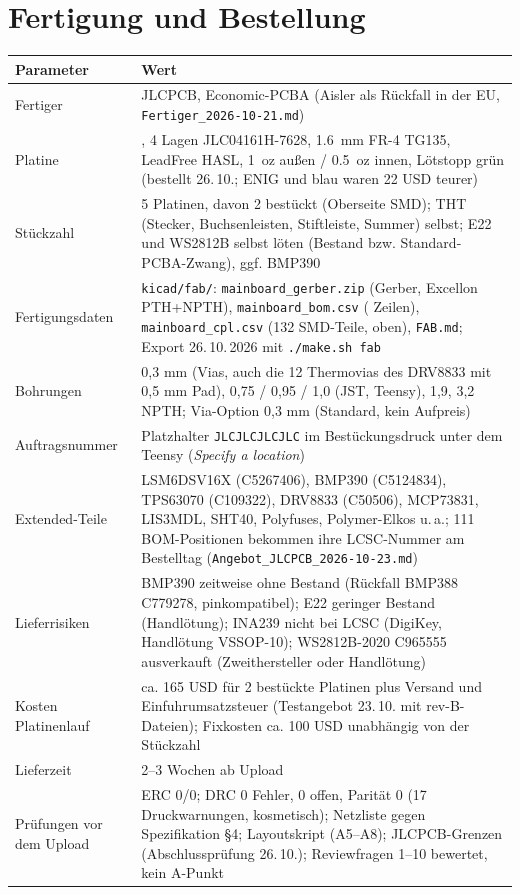 \documentclass[10pt,a4paper,twoside]{article}
\begin{document}
\section{Fertigung und Bestellung}
\begin{tabularx}{\textwidth}{L{40mm} X}
\toprule
\textbf{Parameter} & \textbf{Wert}\\
\midrule
Fertiger & JLCPCB, Economic-PCBA (Aisler als Rückfall in der EU, \texttt{Fertiger\_2026-10-21.md})\\
Platine & , 4 Lagen JLC04161H-7628, \SI{1.6}{mm} FR-4 TG135, LeadFree HASL, \SI{1}{oz} außen / \SI{0.5}{oz} innen, Lötstopp grün (bestellt 26.\,10.; ENIG und blau waren 22 USD teurer)\\
Stückzahl & 5 Platinen, davon 2 bestückt (Oberseite SMD); THT (Stecker, Buchsenleisten, Stiftleiste, Summer) selbst; E22 und WS2812B selbst löten (Bestand bzw. Standard-PCBA-Zwang), ggf. BMP390\\
Fertigungsdaten & \texttt{kicad/fab/}: \texttt{mainboard\_gerber.zip} (Gerber, Excellon PTH+NPTH), \texttt{mainboard\_bom.csv} (\bomLines{} Zeilen), \texttt{mainboard\_cpl.csv} (132 SMD-Teile, oben), \texttt{FAB.md}; Export 26.\,10.\,2026 mit \texttt{./make.sh fab}\\
Bohrungen & 0,3 mm (Vias, auch die 12 Thermovias des DRV8833 mit 0,5 mm Pad), 0,75 / 0,95 / 1,0 (JST, Teensy), 1,9, 3,2 NPTH; Via-Option 0,3 mm (Standard, kein Aufpreis)\\
Auftragsnummer & Platzhalter \texttt{JLCJLCJLCJLC} im Bestückungsdruck unter dem Teensy (\emph{Specify a location})\\
Extended-Teile & LSM6DSV16X (C5267406), BMP390 (C5124834), TPS63070 (C109322), DRV8833 (C50506), MCP73831, LIS3MDL, SHT40, Polyfuses, Polymer-Elkos u.\,a.; 111 BOM-Positionen bekommen ihre LCSC-Nummer am Bestelltag (\texttt{Angebot\_JLCPCB\_2026-10-23.md})\\
Lieferrisiken & BMP390 zeitweise ohne Bestand (Rückfall BMP388 C779278, pinkompatibel); E22 geringer Bestand (Handlötung); INA239 nicht bei LCSC (DigiKey, Handlötung VSSOP-10); WS2812B-2020 C965555 ausverkauft (Zweithersteller oder Handlötung)\\
Kosten Platinenlauf & ca. 165 USD für 2 bestückte Platinen plus Versand und Einfuhrumsatzsteuer (Testangebot 23.\,10. mit rev-B-Dateien); Fixkosten ca. 100 USD unabhängig von der Stückzahl\\
Lieferzeit & 2--3 Wochen ab Upload\\
Prüfungen vor dem Upload & ERC 0/0; DRC 0 Fehler, 0 offen, Parität 0 (17 Druckwarnungen, kosmetisch); Netzliste gegen Spezifikation §4; Layoutskript (A5--A8); JLCPCB-Grenzen (Abschlussprüfung 26.\,10.); Reviewfragen 1--10 bewertet, kein A-Punkt\\
\bottomrule
\end{tabularx}
\end{document}
